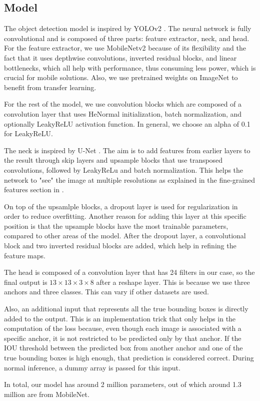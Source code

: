 \subsection{Model}
    The object detection model is inspired by YOLOv2 \cite{yolov2}. The neural network is fully convolutional and is composed of three parts: feature extractor, neck, and head. For the feature extractor, we use MobileNetv2 \cite{mobilenetv2} because of its flexibility and the fact that it uses depthwise convolutions, inverted residual blocks, and linear bottlenecks, which all help with performance, thus consuming less power, which is crucial for mobile solutions. Also, we use pretrained weights on ImageNet \cite{imagenet} to benefit from transfer learning.
    
    For the rest of the model, we use convolution blocks which are composed of a convolution layer that uses HeNormal initialization, batch normalization, and optionally LeakyReLU activation function. In general, we choose an alpha of 0.1 for LeakyReLU.
    
    The neck is inspired by U-Net \cite{unet}. The aim is to add features from earlier layers to the result through skip layers and upsample blocks that use transposed convolutions, followed by LeakyReLu and batch normalization. This helps the network to "see" the image at multiple resolutions as explained in the fine-grained features section in \cite{yolov2}.

    On top of the upsamlple blocks, a dropout layer is used for regularization in order to reduce overfitting. Another reason for adding this layer at this specific position is that the upsample blocks have the most trainable parameters, compared to other areas of the model. After the dropout layer, a convolutional block and two inverted residual blocks are added, which help in refining the feature maps.

    The head is composed of a convolution layer that has 24 filters in our case, so the final output is $13 \times 13 \times 3 \times 8$ after a reshape layer. This is because we use three anchors and three classes. This can vary if other datasets are used.
    
    Also, an additional input that represents all the true bounding boxes is directly added to the output. This is an implementation trick that only helps in the computation of the loss because, even though each image is associated with a specific anchor, it is not restricted to be predicted only by that anchor. If the IOU threshold between the predicted box from another anchor and one of the true bounding boxes is high enough, that prediction is considered correct. During normal inference, a dummy array is passed for this input.
    
    In total, our model has around 2 million parameters, out of which around 1.3 million are from MobileNet.
 
    

